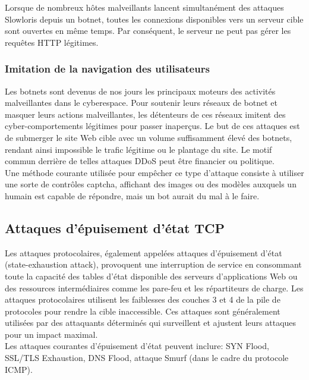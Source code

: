 	Lorsque de nombreux hôtes malveillants lancent simultanément des attaques Slowloris depuis un botnet, toutes les connexions disponibles vers un serveur cible sont ouvertes en même temps. Par conséquent, le serveur ne peut pas gérer les requêtes HTTP légitimes.

	\subsubsection{Imitation de la navigation des utilisateurs}
	Les botnets sont devenus de nos jours les principaux moteurs des activités malveillantes dans le cyberespace. Pour soutenir leurs réseaux de botnet et masquer leurs actions malveillantes, les détenteurs de ces réseaux imitent des cyber-comportements légitimes pour passer inaperçus. Le but de ces attaques est de submerger le site Web cible avec un volume suffisamment élevé des botnets, rendant ainsi impossible le trafic légitime ou le plantage du site.
Le motif commun derrière de telles attaques DDoS peut être financier ou politique.\\

	Une méthode courante utilisée pour empêcher ce type d'attaque consiste à utiliser une sorte de contrôles captcha, affichant des images ou des modèles auxquels un humain est capable de répondre, mais un bot aurait du mal à le faire.

	\subsection{Attaques d'épuisement d'état TCP}
	Les attaques protocolaires, également appelées attaques d'épuisement d'état (state-exhaustion attack), provoquent une interruption de service en consommant toute la capacité des tables d'état disponible des serveurs d'applications Web ou des ressources intermédiaires comme les pare-feu et les répartiteurs de charge. Les attaques protocolaires utilisent les faiblesses des couches 3 et 4 de la pile de protocoles pour rendre la cible inaccessible.
Ces attaques sont généralement utilisées par des attaquants déterminés qui surveillent et ajustent leurs attaques pour un impact maximal.\\
	
	Les attaques courantes d'épuisement d'état peuvent inclure: SYN Flood, SSL/TLS Exhaustion, DNS Flood, attaque Smurf (dans le cadre du protocole ICMP).


